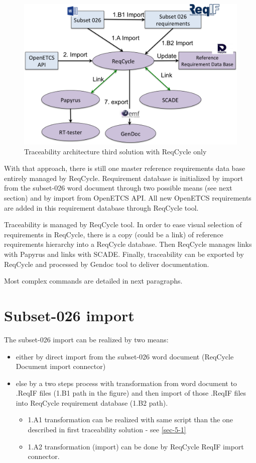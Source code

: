 \documentclass[11pt]{template/openetcs_report}
\begin{document}
\begin{figure}[htb]
\centering
\includegraphics[width=.9\linewidth]{images/Third-Solution-ReqCycle.png}
\caption{\label{fig:trace_third}Traceability architecture third solution with ReqCycle only}
\end{figure}

With that approach, there is still one master reference requirements data base entirely managed by ReqCycle. Requirement database is initialized by import from the subset-026 word document through two possible means (see next section) and by import from OpenETCS API.
All new OpenETCS requirements are added in this requirement database through ReqCycle tool.

Traceability is managed by ReqCycle tool. In order to ease visual selection of requirements in ReqCycle, there is a copy (could be a link) of reference requirements hierarchy into a ReqCycle database. Then ReqCycle manages links with Papyrus and links with SCADE. 
Finally, traceability can be exported by ReqCycle and processed by Gendoc tool to deliver documentation.

Most complex commands are detailed in next paragraphs.


\section{Subset-026 import}
\label{sec-7-1}
The subset-026 import can be realized by two means:
\begin{itemize}
\item either by direct import from the subset-026 word document (ReqCycle Document import connector)
\item else by a two steps process with transformation from word document to .ReqIF files (1.B1 path in the figure) and then import of those .ReqIF files into ReqCycle requirement database (1.B2 path).
	\begin{itemize}

	\item 1.A1 transformation can be realized with same script than the one described in first traceability solution - see \ref{sec-5-1}

	\item 1.A2 transformation (import) can be done by ReqCycle ReqIF import connector.
	\end{itemize}
\end{itemize}
\end{document}
